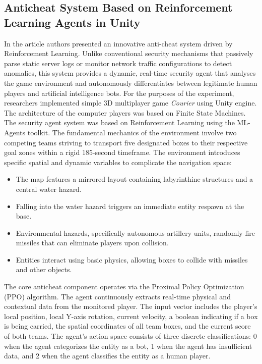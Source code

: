 \subsection{Anticheat System Based on Reinforcement Learning Agents	in Unity}
In the article \cite{lukas2022anticheat} authors presented an innovative anti-cheat system driven by Reinforcement Learning. Unlike conventional security mechanisms that passively parse static server logs or monitor network traffic configurations to detect anomalies, this system provides a dynamic, real-time security agent that analyses the game environment and autonomously differentiates between legitimate human players and artificial intelligence bots. For the purposes of the experiment, researchers implemented simple 3D multiplayer game \textit{Courier} using Unity engine. The architecture of the computer players was based on Finite State Machines. The security agent system was based on Reinforcement Learning using the ML-Agents toolkit. The fundamental mechanics of the environment involve two competing teams striving to transport five designated boxes to their respective goal zones within a rigid 185-second timeframe. The environment introduces specific spatial and dynamic variables to complicate the navigation space:
\begin{itemize}
	\item The map features a mirrored layout containing labyrinthine structures and a central water hazard.
	\item Falling into the water hazard triggers an immediate entity respawn at the base.
	\item Environmental hazards, specifically autonomous artillery units, randomly fire missiles that can eliminate players upon collision.
	\item Entities interact using basic physics, allowing boxes to collide with missiles and other objects.
\end{itemize}
The core anticheat component operates via the Proximal Policy Optimization (PPO) algorithm. The agent continuously extracts real-time physical and contextual data from the monitored player. The input vector includes the player's local position, local Y-axis rotation, current velocity, a boolean indicating if a box is being carried, the spatial coordinates of all team boxes, and the current score of both teams. The agent's action space consists of three discrete classifications: 0 when the agent categorizes the entity as a bot, 1 when the agent has insufficient data, and 2 when the agent classifies the entity as a human player.
